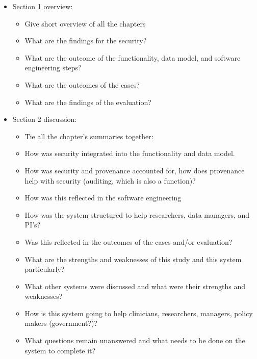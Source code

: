 \begin{itemize}
	\item Section 1 overview:
	\begin{itemize}		
		\item Give short overview of all the chapters
		\item What are the findings for the security?
		\item What are the outcome of the functionality, data model, and software engineering steps?
		\item What are the outcomes of the cases?
		\item What are the findings of the evaluation?
	\end{itemize}
	\item Section 2 discussion:
	\begin{itemize}
		\item Tie all the chapter's summaries together:
		\item How was security integrated into the functionality and data model.
		\item How was security and provenance accounted for, how does provenance help with security (auditing, which is also a function)?
		\item How was this reflected in the software engineering
		\item How was the system structured to help researchers, data managers, and PI's?
		\item Was this reflected in the outcomes of the cases and/or evaluation?
		\item What are the strengths and weaknesses of this study and this system particularly?
		\item What other systems were discussed and what were their strengths and weaknesses?
		\item How is this system going to help clinicians, researchers, managers, policy makers (government?)?
		\item What questions remain unanswered and what needs to be done on the system to complete it?
	\end{itemize}
\end{itemize}